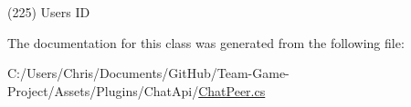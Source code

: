 (225) User\textquotesingle{}s ID



The documentation for this class was generated from the following file\+:\begin{DoxyCompactItemize}
\item 
C\+:/\+Users/\+Chris/\+Documents/\+Git\+Hub/\+Team-\/\+Game-\/\+Project/\+Assets/\+Plugins/\+Chat\+Api/\hyperlink{_chat_peer_8cs}{Chat\+Peer.\+cs}\end{DoxyCompactItemize}

